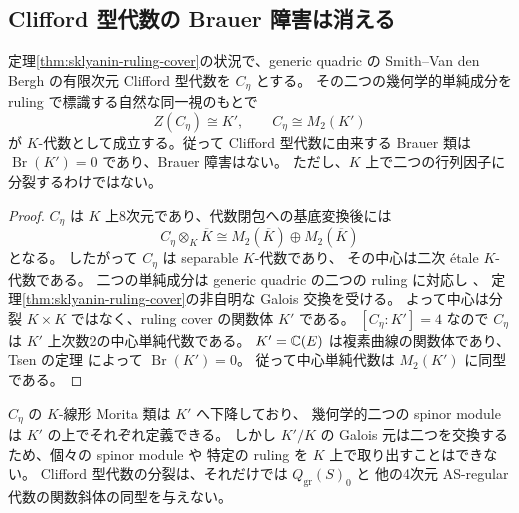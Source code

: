 \subsection{Clifford 型代数の Brauer 障害は消える}
\begin{theorem}\label{thm:sklyanin-clifford-split}
定理\ref{thm:sklyanin-ruling-cover}の状況で、generic quadric の
Smith--Van den Bergh の有限次元 Clifford 型代数を $C_\eta$ とする。
その二つの幾何学的単純成分を ruling で標識する自然な同一視のもとで
\[
 Z(C_\eta)\cong K',\qquad
 C_\eta\cong M_2(K')
\]
が $K$-代数として成立する。従って Clifford 型代数に由来する Brauer 類は
$\operatorname{Br}(K')=0$ であり、Brauer 障害はない。
ただし、$K$ 上で二つの行列因子に分裂するわけではない。
\end{theorem}
\begin{proof}
$C_\eta$ は $K$ 上8次元であり、代数閉包への基底変換後には
\[
 C_\eta\otimes_K\overline K\cong
 M_2(\overline K)\oplus M_2(\overline K)
\]
となる\cite[命題5.3、定理5.6]{SmithVdB}。
したがって $C_\eta$ は separable $K$-代数であり、
その中心は二次 étale $K$-代数である。
二つの単純成分は generic quadric の二つの ruling に対応し
\cite[第7節、第10節]{SmithVdB}、
定理\ref{thm:sklyanin-ruling-cover}の非自明な Galois 交換を受ける。
よって中心は分裂 $K\times K$ ではなく、ruling cover の関数体 $K'$ である。
$[C_\eta:K']=4$ なので $C_\eta$ は $K'$ 上次数2の中心単純代数である。
$K'=\mathbb C(E)$ は複素曲線の関数体であり、
Tsen の定理 \cite[定理59.67.10、補題59.67.11]{StacksTsen}
によって $\operatorname{Br}(K')=0$。
従って中心単純代数は $M_2(K')$ に同型である。
\end{proof}

\begin{remark}
$C_\eta$ の $K$-線形 Morita 類は $K'$ へ下降しており、
幾何学的二つの spinor module は $K'$ の上でそれぞれ定義できる。
しかし $K'/K$ の Galois 元は二つを交換するため、個々の spinor module や
特定の ruling を $K$ 上で取り出すことはできない。
Clifford 型代数の分裂は、それだけでは $Q_{\mathrm{gr}}(S)_0$ と
他の4次元 AS-regular 代数の関数斜体の同型を与えない。
\end{remark}

